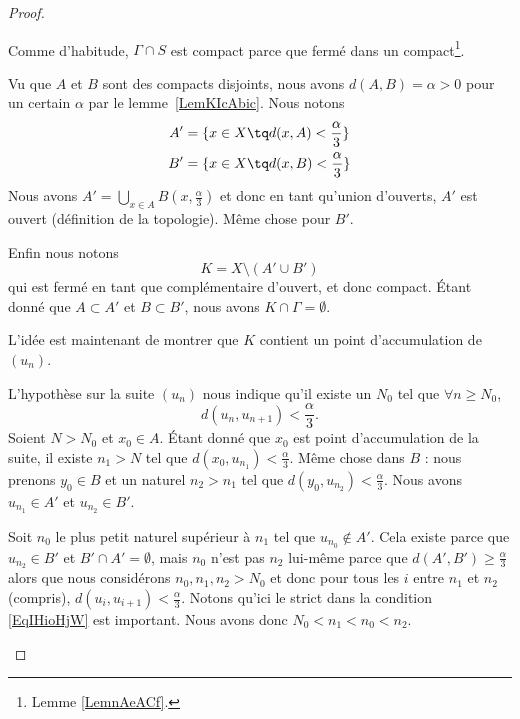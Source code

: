 \begin{proof}
\begin{subproof}
		Comme d'habitude, \( \Gamma\cap S\) est compact parce que fermé dans un compact\footnote{Lemme \ref{LemnAeACf}.}.


		Vu que \( A\) et \( B\) sont des compacts disjoints, nous avons \( d(A,B)=\alpha>0\) pour un certain \( \alpha\) par le lemme~\ref{LemKIcAbic}. Nous notons
		\begin{subequations}
			\begin{align}
				A' & =\{x\in X\tq d(x,A)<\frac{ \alpha }{ 3 }\} \\
				B' & =\{x\in X\tq d(x,B)<\frac{ \alpha }{ 3 }\}
			\end{align}
		\end{subequations}
		Nous avons \( A'=\bigcup_{x\in A}B(x,\frac{ \alpha }{ 3 })\) et donc en tant qu'union d'ouverts, \( A'\) est ouvert (définition de la topologie). Même chose pour \( B'\).

		Enfin nous notons
		\begin{equation}
			K=X\setminus(A'\cup B')
		\end{equation}
		qui est fermé en tant que complémentaire d'ouvert, et donc compact. Étant donné que \( A\subset A'\) et \( B\subset B' \), nous avons \( K\cap \Gamma=\emptyset\).

		L'idée est maintenant de montrer que \( K\) contient un point d'accumulation de \( (u_n)\).


		L'hypothèse sur la suite \( (u_n)\) nous indique qu'il existe un \( N_0\) tel que \( \forall n\geq N_0\),
		\begin{equation}    \label{EqIHioHjW}
			d(u_{n},u_{n+1})<\frac{ \alpha }{ 3 }.
		\end{equation}
		Soient \( N>N_0 \) et \( x_0\in A\). Étant donné que \( x_0\) est point d'accumulation de la suite, il existe \( n_1>N\) tel que \( d(x_0,u_{n_1})<\frac{ \alpha }{ 3 }\). Même chose dans \( B\) : nous prenons \( y_0\in B\) et un naturel \( n_2>n_1\) tel que \( d(y_0,u_{n_2})<\frac{ \alpha }{ 3 }\). Nous avons \( u_{n_1}\in A'\) et \( u_{n_2}\in B'\).

		Soit \( n_0\) le plus petit naturel supérieur à \( n_1\) tel que \( u_{n_0}\notin A'\). Cela existe parce que \( u_{n_2}\in B'\) et \( B'\cap A'=\emptyset\), mais \( n_0\) n'est pas \( n_2\) lui-même parce que \( d(A',B')\geq \frac{ \alpha }{ 3 }\) alors que nous considérons \( n_0,n_1,n_2>N_0\) et donc pour tous les \( i\) entre \( n_1\) et \( n_2\) (compris), \( d(u_i,u_{i+1})<\frac{ \alpha }{ 3 }\). Notons qu'ici le strict dans la condition \eqref{EqIHioHjW} est important. Nous avons donc \(N_0<n_1<n_0<n_2\).


\end{subproof}
\end{proof}
